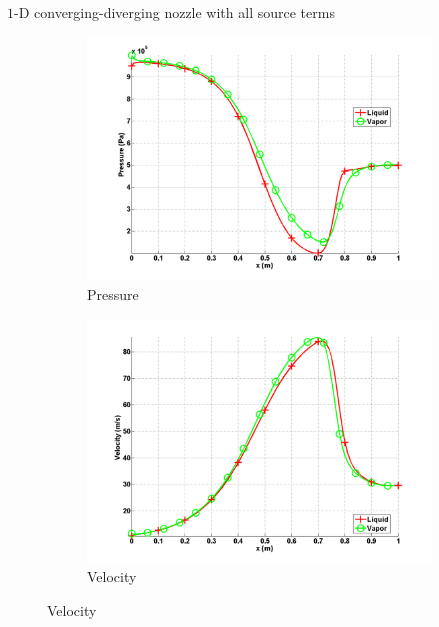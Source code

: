 \documentclass[xcolor=dvipsnames,10pt]{beamer}
\begin{document}
\begin{frame}{$1$-D converging-diverging nozzle with all source terms}
\begin{figure}[H]
\begin{subfigure}[b]{0.37\textwidth}
\centering
\includegraphics[width=\textwidth]{../figures/SEM/Aint1e3MassOn_two_phases_pressure.png}
\caption{Pressure}
\end{subfigure}
%
\begin{subfigure}[b]{0.37\textwidth}
\centering
\includegraphics[width=\textwidth]{../figures/SEM/Aint1e3MassOn_two_phases_velocity.png}
\caption{Velocity}
\end{subfigure}


\end{figure}
\end{frame}
\end{document}
